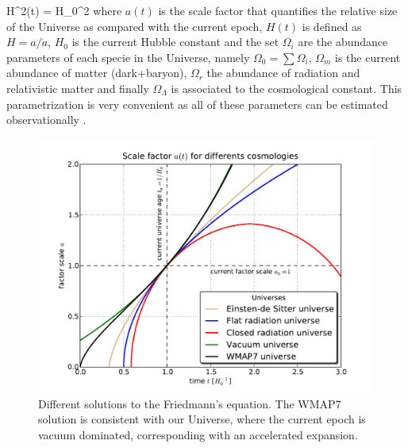\documentclass[a4,useAMS,usenatbib,usegraphicx,12pt]{article}
\begin{document}
{ H^2(t) = H_0^2 }
where $a(t)$ is the scale factor that quantifies the relative size of the 
Universe as compared with the current epoch, $H(t)$ is defined as $H = a/
\dot a$, $H_0$ is the current Hubble constant and the set $\Omega_i$ are the
abundance parameters of each specie in the Universe, namely $\Omega_0 = \sum 
\Omega_i$, $\Omega_m$ is the current abundance of matter (dark+baryon), 
$\Omega_r$ the abundance of radiation and relativistic matter and finally 
$\Omega_\Lambda$ is associated to the cosmological constant. This 
parametrization is very convenient as all of these parameters can be estimated
observationally \citep{Planck13XVI}.

\begin{figure}[h]
\centering

  \includegraphics[trim = 12mm 4mm 17mm 8mm, clip, keepaspectratio=true,
  width=0.4\textheight]{./figures/Friedmann_Solution.pdf}
  
  \caption{\small Different solutions to the Friedmann's equation. The WMAP7
  solution is consistent with our Universe, where the current epoch
  is vacuum dominated, corresponding with an accelerated expansion.}

  \label{fig:Friedmann}

\end{figure}
\end{document}
